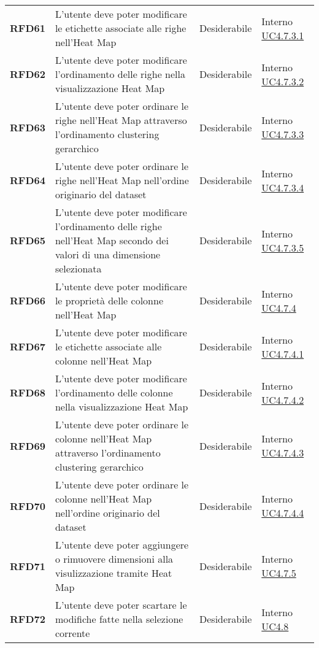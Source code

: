 \begin{longtable}[H]{>{\centering\bfseries}m{2cm} >{\centering}m{9cm} >{\centering}m{2.5cm} >{\centering\arraybackslash}m{2.5cm}}
    RFD61
    & L'utente deve poter modificare le etichette associate alle righe nell'Heat Map
    & Desiderabile
    & Interno  \hyperref[spar:uc4.7.3.1]{UC4.7.3.1} \\

    RFD62
    & L'utente deve poter modificare l'ordinamento delle righe nella visualizzazione Heat Map
    & Desiderabile
    & Interno  \hyperref[spar:uc4.7.3.2]{UC4.7.3.2} \\

    RFD63
    & L'utente deve poter ordinare le righe nell'Heat Map attraverso l'ordinamento clustering gerarchico
    & Desiderabile
    & Interno  \hyperref[spar:uc4.7.3.3]{UC4.7.3.3} \\

    RFD64
    & L'utente deve poter ordinare le righe nell'Heat Map nell'ordine originario del dataset
    & Desiderabile
    & Interno  \hyperref[spar:uc4.7.3.4]{UC4.7.3.4} \\

    RFD65
    & L'utente deve poter modificare l'ordinamento delle righe nell'Heat Map secondo dei valori di una dimensione selezionata
    & Desiderabile
    & Interno  \hyperref[spar:uc4.7.3.5]{UC4.7.3.5} \\

    RFD66
    & L'utente deve poter modificare le proprietà delle colonne nell'Heat Map
    & Desiderabile
    & Interno  \hyperref[par:uc4.7.4]{UC4.7.4} \\

    RFD67
    & L'utente deve poter modificare le etichette associate alle colonne nell'Heat Map
    & Desiderabile
    & Interno  \hyperref[spar:uc4.7.4.1]{UC4.7.4.1} \\


    RFD68
    & L'utente deve poter modificare l'ordinamento delle colonne nella visualizzazione Heat Map
    & Desiderabile
    & Interno  \hyperref[spar:uc4.7.4.2]{UC4.7.4.2} \\

    RFD69
    & L'utente deve poter ordinare le colonne nell'Heat Map attraverso l'ordinamento clustering gerarchico
    & Desiderabile
    & Interno  \hyperref[spar:uc4.7.4.3]{UC4.7.4.3} \\

    RFD70
    & L'utente deve poter ordinare le colonne nell'Heat Map nell'ordine originario del dataset
    & Desiderabile
    & Interno  \hyperref[spar:uc4.7.4.4]{UC4.7.4.4} \\

    RFD71
    & L'utente deve poter aggiungere o rimuovere dimensioni alla visulizzazione tramite Heat Map
    & Desiderabile
    & Interno  \hyperref[par:uc4.7.5]{UC4.7.5} \\

    RFD72
    & L'utente deve poter scartare le modifiche fatte nella selezione corrente
    & Desiderabile
    & Interno  \hyperref[ssub:uc4.8]{UC4.8} \\

\end{longtable}
